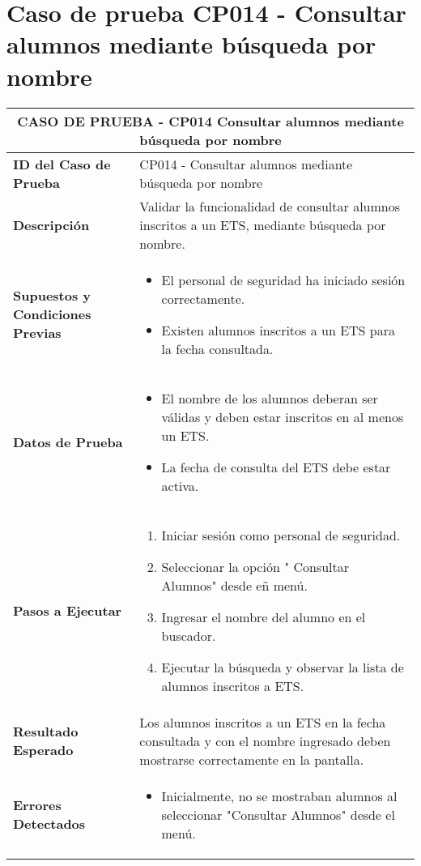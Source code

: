 \section{Caso de prueba CP014 - Consultar alumnos mediante búsqueda por nombre}

\begin{longtable}{|p{5cm}|p{10cm}|}
	\hline
	\multicolumn{2}{|c|}{\textbf{CASO DE PRUEBA - CP014 Consultar alumnos mediante búsqueda por nombre}} \\
	\hline
	\textbf{ID del Caso de Prueba} & CP014 - Consultar alumnos mediante búsqueda por nombre \\
	\hline
	\textbf{Descripción} & Validar la funcionalidad de consultar alumnos inscritos a un ETS, mediante búsqueda por nombre. \\
	\hline
	\textbf{Supuestos y Condiciones Previas} & 
	\begin{itemize}
		\item El personal de seguridad ha iniciado sesión correctamente.
		\item Existen alumnos inscritos a un ETS para la fecha consultada.
	\end{itemize} \\
	\hline
	\textbf{Datos de Prueba} & 
	\begin{itemize}
		\item El nombre de los alumnos deberan ser válidas y deben estar inscritos en al menos un ETS.
		\item La fecha de consulta del ETS debe estar activa.
	\end{itemize} \\
	\hline
	\textbf{Pasos a Ejecutar} & 
	\begin{enumerate}
		\item Iniciar sesión como personal de seguridad.
		\item Seleccionar la opción " Consultar Alumnos" desde eñ menú.
		\item Ingresar el nombre del alumno en el buscador.
		\item Ejecutar la búsqueda y observar la lista de alumnos inscritos a ETS.
	\end{enumerate} \\
	\hline
	\textbf{Resultado Esperado} & 
	Los alumnos inscritos a un ETS en la fecha consultada y con el nombre ingresado deben mostrarse correctamente en la pantalla. \\
	\hline
	\textbf{Errores Detectados} &
	\begin{itemize}
		\item Inicialmente, no se mostraban alumnos al seleccionar "Consultar Alumnos" desde el menú.

\end{itemize}
\end{longtable}

